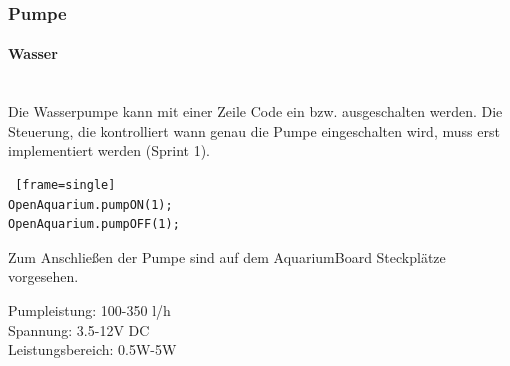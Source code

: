 \subsubsection{Pumpe}
\paragraph{Wasser} \mbox{} \\
Die Wasserpumpe kann mit einer Zeile Code ein bzw. ausgeschalten werden. Die Steuerung, die kontrolliert wann genau die Pumpe eingeschalten wird, muss erst implementiert werden (Sprint 1).

\begin{lstlisting} [frame=single]
OpenAquarium.pumpON(1); 
OpenAquarium.pumpOFF(1);
\end{lstlisting}
Zum Anschlie{\ss}en der Pumpe sind auf dem AquariumBoard Steckplätze vorgesehen. \\
\begin{minipage}{5in}
  \centering
\end{minipage}
Pumpleistung: 100-350 l/h \\
Spannung: 3.5-12V DC \\
Leistungsbereich: 0.5W-5W \\
\newpage

